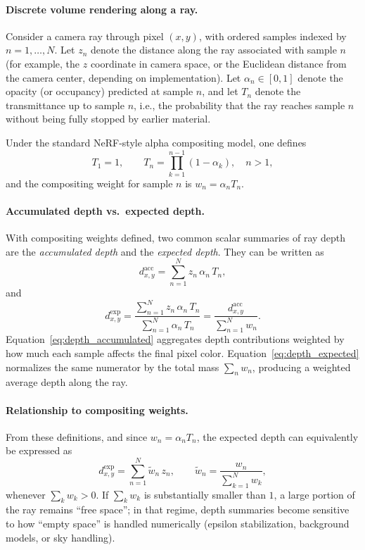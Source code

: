 \paragraph{Discrete volume rendering along a ray.}
Consider a camera ray through pixel $(x,y)$, with ordered samples indexed by $n=1,\dots,N$. Let $z_n$ denote the distance along the ray associated with sample $n$ (for example, the $z$ coordinate in camera space, or the Euclidean distance from the camera center, depending on implementation). Let $\alpha_n\in[0,1]$ denote the opacity (or occupancy) predicted at sample $n$, and let $T_n$ denote the transmittance up to sample $n$, i.e., the probability that the ray reaches sample $n$ without being fully stopped by earlier material.

Under the standard NeRF-style alpha compositing model, one defines
\[
T_1=1,\qquad
T_n=\prod_{k=1}^{n-1}(1-\alpha_k),\quad n>1,
\]
and the compositing weight for sample $n$ is $w_n=\alpha_n T_n$.

\paragraph{Accumulated depth vs.\ expected depth.}
With compositing weights defined, two common scalar summaries of ray depth are the \emph{accumulated depth} and the \emph{expected depth}. They can be written as
\begin{equation}
d_{x,y}^{\mathrm{acc}}=\sum_{n=1}^{N} z_n\,\alpha_n\,T_n,
\label{eq:depth_accumulated}
\end{equation}
and
\begin{equation}
d_{x,y}^{\mathrm{exp}}=
\frac{\sum_{n=1}^{N} z_n\,\alpha_n\,T_n}{\sum_{n=1}^{N} \alpha_n\,T_n}
=
\frac{d_{x,y}^{\mathrm{acc}}}{\sum_{n=1}^{N} w_n}.
\label{eq:depth_expected}
\end{equation}
Equation~\eqref{eq:depth_accumulated} aggregates depth contributions weighted by how much each sample affects the final pixel color. Equation~\eqref{eq:depth_expected} normalizes the same numerator by the total mass $\sum_n w_n$, producing a weighted average depth along the ray.

\paragraph{Relationship to compositing weights.}
From these definitions, and since $w_n=\alpha_n T_n$, the expected depth can equivalently be expressed as
\[
d_{x,y}^{\mathrm{exp}}=\sum_{n=1}^{N} \tilde{w}_n\, z_n,
\qquad
\tilde{w}_n=\frac{w_n}{\sum_{k=1}^{N} w_k},
\]
whenever $\sum_k w_k>0$. If $\sum_k w_k$ is substantially smaller than $1$, a large portion of the ray remains ``free space''; in that regime, depth summaries become sensitive to how ``empty space'' is handled numerically (epsilon stabilization, background models, or sky handling).

